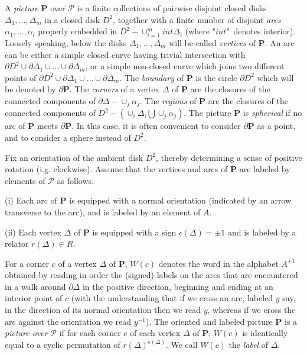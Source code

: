 \documentclass[12pt,reqno]{amsart}
\begin{document}
A {\it picture} $\mathbf{P}$ over  $\mathcal{P}$ is a finite collections of pairwise disjoint closed disks $\Delta_1,\ldots, \Delta_m$ in a closed disk $D^2$,
together with a finite number of disjoint {\it arcs} $\alpha_1,\ldots,\alpha_l$ properly embedded in $D^2 -\cup_{i=1}^mint\Delta_i$
(where "$int$"\, denotes interior). Loosely speaking, below the disks $\Delta_1,\ldots,\Delta_m$ will be called {\it vertices} of $\mathbf{P}$. An arc
can be either a simple closed curve having trivial intersection  with
 $\partial D^2\cup\partial\Delta_1\cup\ldots\cup\partial\Delta_m$, or a simple non-closed curve which joins two different points of $\partial D^2\cup\partial\Delta_1\cup\ldots\cup\partial\Delta_m$.
The {\it boundary}  of $\mathbf{P}$ is the circle $\partial D^2$ which will be denoted by $\partial \mathbf{P}$.
The {\it corners} of a vertex $\Delta$ of $\mathbf{P}$ are the closures of the connected components of $\partial\Delta -\cup_{j}\alpha_j$.
The {\it regions} of $\mathbf{P}$ are the closures of the connected components of $D^2-(\cup_i\Delta_i\bigcup\cup_j\alpha_j)$.
The picture $\mathbf{P}$ is {\it spherical} if no arc of $\mathbf{P}$ meets $\partial \mathbf{P}$. In this case, it is often convenient to consider $\partial \mathbf{P}$ as a point, and to consider a sphere instead of $D^2$.

Fix an
orientation of the ambient disk $D^2$, thereby determining a sense of positive rotation (i.g. clockwise). Assume that the vertices and arcs of $\mathbf{P}$ are labeled by elements of $\mathcal{P}$ as follows.

(i) Each arc of $\mathbf{P}$ is equipped with a normal orientation (indicated  by an arrow transverse to the arc), and is labeled by an element of $A$.

(ii) Each vertex $\Delta$ of $\mathbf{P}$ is equipped with a sign $\epsilon(\Delta) = \pm 1$ and is labeled by a relator $r(\Delta)\in R$.

For a corner $c$ of a vertex $\Delta$ of $\mathbf{P}$, $W(c)$ denotes the word in the alphabet $A^{\pm 1}$ obtained by reading in order the (signed) labels on the arcs that are encountered in a walk around $\partial\Delta$ in the positive direction, beginning and ending at an interior point of $c$ (with the understanding that if we cross an arc, labeled $y$ say, in the direction of its normal orientation then we read $y$, whereas  if we cross the arc against the orientation we read $y^{-1}$).
The oriented and labeled picture $\mathbf{P}$ is a {\it picture over} $\mathcal{P}$ if for each corner $c$ of each vertex $\Delta$ of $\mathbf{P}$, $W(c)$ is identically equal to a  cyclic permutation of $r(\Delta)^{\epsilon(\Delta)}$.
We call  $W(c)$ the {\it label} of $\Delta$.%
\end{document}
